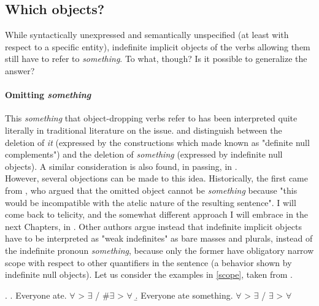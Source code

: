 \subsection{Which objects?}

While syntactically unexpressed and semantically unspecified (at least with respect to a specific entity), indefinite implicit objects of the verbs allowing them still have to refer to \textit{something}. To what, though? Is it possible to generalize the answer?

\paragraph{Omitting \textit{something}}
This \textit{something} that object-dropping verbs refer to has been interpreted quite literally in traditional literature on the issue. \textcite{KatzPostal1967integrated} and \textcite{FraserRoss1970idioms} distinguish between the deletion of \textit{it} (expressed by the constructions which \textcite{fillmore1969types, Fillmore1986} made known as "definite null complements") and the deletion of \textit{something} (expressed by indefinite null objects). A similar consideration is also found, in passing, in \textcite[30]{PethoKardos2006}.\\
However, several objections can be made to this idea. Historically, the first came from \textcite{Mittwoch1982, Mittwoch2005}, who argued that the omitted object cannot be \textit{something} because "this would be incompatible with the atelic nature of the resulting sentence". I will come back to telicity, and the somewhat different approach I will embrace in the next Chapters, in . Other authors \parencite{Marti2015, fodor1980functional, Melchin2019, Gillon2012, Dvorak2017} argue instead that indefinite implicit objects have to be interpreted as "weak indefinites" \parencite[55]{Melchin2019} as bare masses and plurals, instead of the indefinite pronoun \textit{something}, because only the former have obligatory narrow scope with respect to other quantifiers in the sentence (a behavior shown by indefinite null objects). Let us consider the examples in \ref{scope}, taken from \parencite[55]{Melchin2019}.

\ex. \label{scope} \a. \label{scope1} Everyone ate. \hfill $\forall$ > $\exists$ / #$\exists$ > $\forall$
\b. \label{scope2} Everyone ate something. \hfill $\forall$ > $\exists$ / $\exists$ > $\forall$

